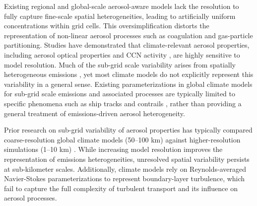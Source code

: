 \documentclass[acp, manuscript]{copernicus}
\begin{document}
Existing regional and global-scale aerosol-aware models lack the
resolution to fully capture fine-scale spatial heterogeneities,
leading to artificially uniform concentrations within grid cells. This
oversimplification distorts the representation of non-linear aerosol
processes such as coagulation and gas-particle partitioning. Studies
have demonstrated that climate-relevant aerosol properties, including
aerosol optical properties \citep{gustafson_jr_downscaling_2011} and
CCN activity \citep{weigum_effect_2016}, are highly sensitive to model
resolution. Much of the sub-grid scale variability arises from
spatially heterogeneous emissions \citep{qian_investigation_2010}, yet most climate models do not explicitly represent this variability in a general sense. Existing parameterizations in global climate models for sub-grid scale emissions and associated processes are typically limited to specific phenomena such as ship tracks \citep{huszar_modeling_2010} and contrails \citep{burkhardt_processbased_2009}, rather than providing a general treatment of emissions-driven aerosol heterogeneity.


Prior research on sub-grid variability of aerosol properties has
typically compared coarse-resolution global climate models (50--100 km)
against higher-resolution simulations (1--10 km)
\citep{qian_investigation_2010, gustafson_jr_downscaling_2011,
  weigum_effect_2016, crippa_impact_2017,
  lin_quantification_2017}. While increasing model resolution improves
the representation of emissions heterogeneities, unresolved spatial
variability persists at sub-kilometer scales. Additionally,
climate models rely on Reynolds-averaged Navier-Stokes
parameterizations to represent boundary-layer turbulence, which fail
to capture the full complexity of turbulent transport and its
influence on aerosol processes.
\end{document}
